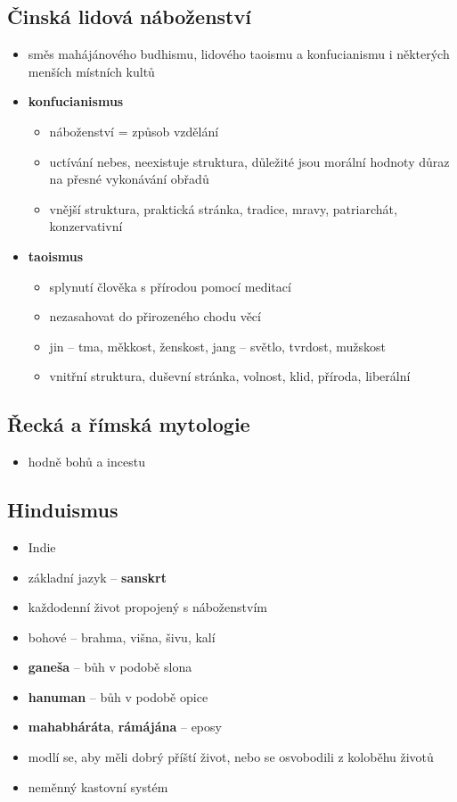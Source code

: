 \subsection{Činská lidová náboženství}
\begin{itemize}
\item směs mahájánového budhismu, lidového taoismu a konfucianismu i některých menších místních kultů
\item \textbf{konfucianismus}
	\begin{itemize}
	\item náboženství = způsob vzdělání
	\item uctívání nebes, neexistuje struktura, důležité jsou morální hodnoty důraz na přesné vykonávání obřadů
	\item vnější struktura, praktická stránka, tradice, mravy, patriarchát, konzervativní
	\end{itemize}
\item \textbf{taoismus}
	\begin{itemize}
	\item splynutí člověka s přírodou pomocí meditací
	\item nezasahovat do přirozeného chodu věcí
	\item jin -- tma, měkkost, ženskost, jang -- světlo, tvrdost, mužskost
	\item vnitřní struktura, duševní stránka, volnost, klid, příroda, liberální
	\end{itemize}
\end{itemize}

\subsection{Řecká a římská mytologie}
\begin{itemize}
\item hodně bohů a incestu
\end{itemize}

\subsection{Hinduismus}
\begin{itemize}
\item Indie
\item základní jazyk -- \textbf{sanskrt}
\item každodenní život propojený s náboženstvím
\item bohové -- brahma, višna, šivu, kalí
\item \textbf{ganeša} -- bůh v podobě slona
\item \textbf{hanuman} -- bůh v podobě opice
\item \textbf{mahabháráta}, \textbf{rámájána} -- eposy
\item modlí se, aby měli dobrý příští život, nebo se osvobodili z koloběhu životů
\item neměnný kastovní systém
\end{itemize}


